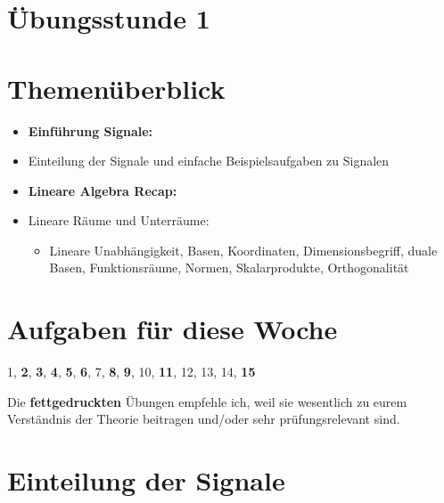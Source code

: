 \documentclass[11pt]{article}
\renewcommand{\thesection}{\arabic{section}}
\begin{document}
\thispagestyle{firstpage}

\setlength{\headheight}{1 \baselineskip}  %
\setlength{\parindent}{0pt}  %
\setlength{\parskip}{\baselineskip}  %

\vspace*{-5px}
\section*{Übungsstunde 1}

\section*{Themenüberblick}
\begin{itemize}
    \item \textbf{Einführung Signale:}
    \item[] Einteilung der Signale und einfache Beispielsaufgaben zu Signalen
    \item \textbf{Lineare Algebra Recap:}
    \item[] Lineare Räume und Unterräume: \begin{itemize}
        \item[] Lineare Unabhängigkeit, Basen, Koordinaten, Dimensionsbegriff, duale Basen, Funktionsräume, Normen, Skalarprodukte, Orthogonalität
    \end{itemize}
\end{itemize}

\section*{Aufgaben für diese Woche}
\vspace{-0.5cm}

1, \textbf{2}, \textbf{3}, \textbf{4}, \textbf{5}, \textbf{6}, 7, \textbf{8}, \textbf{9}, 10, \textbf{11}, 12, 13, 14, \textbf{15}\\
\vspace{-0.5cm}

Die \textbf{fettgedruckten} Übungen empfehle ich, weil sie wesentlich zu eurem Verständnis der Theorie beitragen und/oder sehr prüfungsrelevant sind.

\vfill \null
\pagebreak



\setcounter{section}{1}
\renewcommand{\thesection}{1} %
\section{Einteilung der Signale}
\vspace*{-0.5cm}
\end{document}
